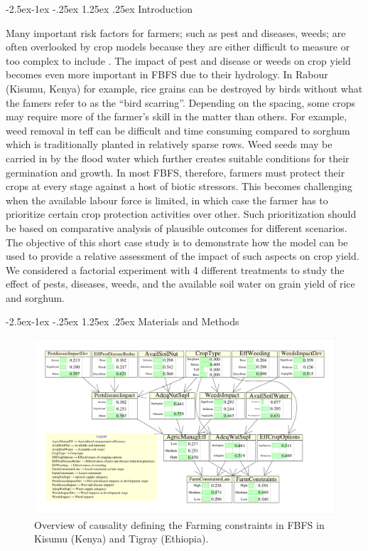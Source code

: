 \documentclass[12pt,oneside]{article}
\makeatletter
\renewcommand\paragraph{\@startsection{paragraph}{4}{\z@}%
            {-2.5ex\@plus -1ex \@minus -.25ex}%
            {1.25ex \@plus .25ex}%
            {\normalfont\normalsize\bfseries}}
\makeatother
\begin{document}
\hypertarget{introduction-3}{%
\paragraph{Introduction}\label{introduction-3}}

Many important risk factors for farmers; such as pest and diseases,
weeds; are often overlooked by crop models because they are either
difficult to measure or too complex to include . The impact of pest and
disease or weeds on crop yield becomes even more important in FBFS due
to their hydrology. In Rabour (Kisumu, Kenya) for example, rice grains
can be destroyed by birds without what the famers refer to as the ``bird
scarring''. Depending on the spacing, some crops may require more of the
farmer's skill in the matter than others. For example, weed removal in
teff can be difficult and time consuming compared to sorghum which is
traditionally planted in relatively sparse rows. Weed seeds may be
carried in by the flood water which further creates suitable conditions
for their germination and growth. In most FBFS, therefore, farmers must
protect their crops at every stage against a host of biotic stressors.
This becomes challenging when the available labour force is limited, in
which case the farmer has to prioritize certain crop protection
activities over other. Such prioritization should be based on
comparative analysis of plausible outcomes for different scenarios. The
objective of this short case study is to demonstrate how the model can
be used to provide a relative assessment of the impact of such aspects
on crop yield. We considered a factorial experiment with 4 different
treatments to study the effect of pests, diseases, weeds, and the
available soil water on grain yield of rice and sorghum.

\hypertarget{materials-and-methods-1}{%
\paragraph{Materials and Methods}\label{materials-and-methods-1}}

\begin{figure}
\includegraphics[width=1\linewidth]{figures/Modelling_FBFS_Farming_Constraints} \caption{\label{figures:figure_7}Overview of causality defining the Farming constraints in FBFS in Kisumu (Kenya) and Tigray (Ethiopia).}\label{fig:figure_7}
\end{figure}
\end{document}
